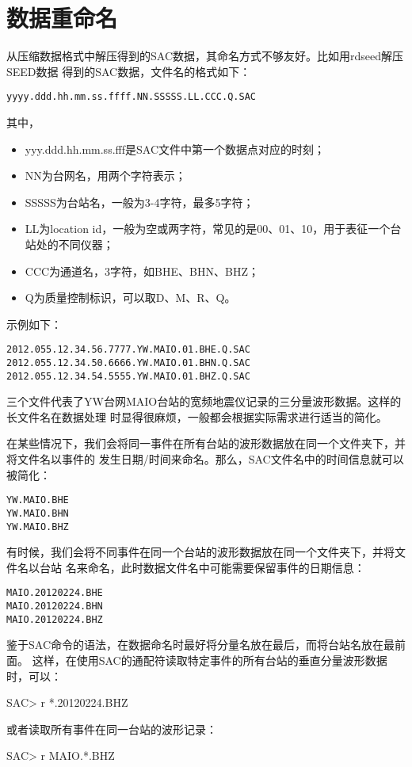 \section{数据重命名}
从压缩数据格式中解压得到的SAC数据，其命名方式不够友好。比如用rdseed解压SEED数据
得到的SAC数据，文件名的格式如下：
\begin{lstlisting}[style=Shell]
yyyy.ddd.hh.mm.ss.ffff.NN.SSSSS.LL.CCC.Q.SAC
\end{lstlisting}
其中，
\begin{itemize}
\item yyy.ddd.hh.mm.ss.fff是SAC文件中第一个数据点对应的时刻；
\item NN为台网名，用两个字符表示；
\item SSSSS为台站名，一般为3-4字符，最多5字符；
\item LL为location id，一般为空或两字符，常见的是00、01、10，用于表征一个台站处的不同仪器；
\item CCC为通道名，3字符，如BHE、BHN、BHZ；
\item Q为质量控制标识，可以取D、M、R、Q。
\end{itemize}

示例如下：
\begin{lstlisting}[style=Bash]
2012.055.12.34.56.7777.YW.MAIO.01.BHE.Q.SAC
2012.055.12.34.50.6666.YW.MAIO.01.BHN.Q.SAC
2012.055.12.34.54.5555.YW.MAIO.01.BHZ.Q.SAC
\end{lstlisting}
三个文件代表了YW台网MAIO台站的宽频地震仪记录的三分量波形数据。这样的长文件名在数据处理
时显得很麻烦，一般都会根据实际需求进行适当的简化。

在某些情况下，我们会将同一事件在所有台站的波形数据放在同一个文件夹下，并将文件名以事件的
发生日期/时间来命名。那么，SAC文件名中的时间信息就可以被简化：
\begin{lstlisting}[style=Bash]
YW.MAIO.BHE
YW.MAIO.BHN
YW.MAIO.BHZ
\end{lstlisting}

有时候，我们会将不同事件在同一个台站的波形数据放在同一个文件夹下，并将文件名以台站
名来命名，此时数据文件名中可能需要保留事件的日期信息：
\begin{lstlisting}[style=Bash]
MAIO.20120224.BHE
MAIO.20120224.BHN
MAIO.20120224.BHZ
\end{lstlisting}

鉴于SAC命令的语法，在数据命名时最好将分量名放在最后，而将台站名放在最前面。
这样，在使用SAC的通配符读取特定事件的所有台站的垂直分量波形数据时，可以：
\begin{SACCode}
SAC> r *.20120224.BHZ
\end{SACCode}
或者读取所有事件在同一台站的波形记录：
\begin{SACCode}
SAC> r MAIO.*.BHZ
\end{SACCode}